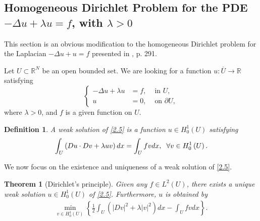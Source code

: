 \documentclass[11pt,a4paper,center,notitlepage]{article}
\numberwithin{equation}{section}
\newtheorem{definition}{Definition}[section]
\newtheorem{theorem}{Theorem}[section]
\begin{document}
\subsection{Homogeneous Dirichlet Problem for the PDE $-\Delta u +\lambda u=f$, with $\lambda >0$}
This section is an obvious modification to the homogeneous Dirichlet problem for the Laplacian $-\Delta u +u=f$ presented in \cite{2}, p. 291.

Let $U \subset \mathbb{R}^N$ be an open bounded set. We are looking for a function $u: \overline{U}\to \mathbb{R}$ satisfying 
\begin{equation}
\label{2.5}
\left\{ \begin{split}
 - \Delta u + \lambda u &= f, & \mbox{ in } U,\\
u &= 0, & \mbox{ on } \partial U,
\end{split} \right.
\end{equation}
where $\lambda >0$, and $f$ is a given function on $U$.
\begin{definition}
A \emph{weak solution} of \eqref{2.5} is a function $u\in H_0^1\left(U\right)$ satisfying
\begin{align}
\int_U {\left( {Du \cdot Dv + \lambda uv} \right)dx}  = \int_U {fvdx} ,\hspace{2mm} \forall v \in H_0^1\left( U \right).
\end{align}
\end{definition}
We now focus on the existence and uniqueness of a weak solution of \eqref{2.5}.
\begin{theorem}[Dirichlet's principle]
Given any $f\in L^2\left(U\right)$, there exists a unique weak solution $u\in H_0^1\left(U\right)$ of \eqref{2.5}. Furthermore, $u$ is obtained by 
\begin{align}
\mathop {\min }\limits_{v \in H_0^1\left( U \right)} \left\{ {\frac{1}{2}\int_U {\left( {{{\left| {Dv} \right|}^2} + \lambda {{\left| v \right|}^2}} \right)dx}  - \int_U {fvdx} } \right\}.
\end{align}
\end{theorem}
\end{document}

